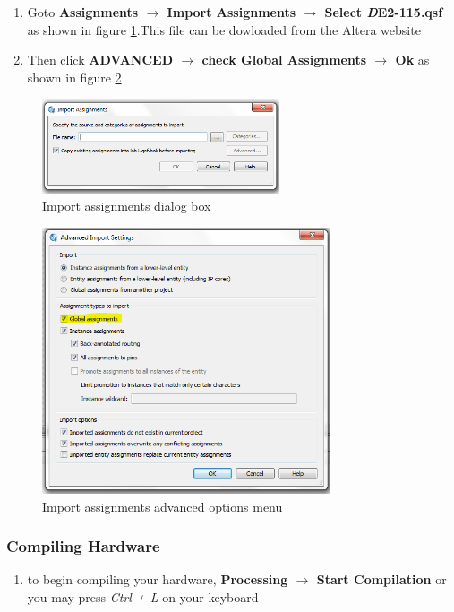  \begin{enumerate}  
 
	\item Goto {\bf Assignments $\rightarrow$  Import Assignments $\rightarrow$  Select \emph DE2-115.qsf} as shown in figure \ref{fig:importassign}.This file can be dowloaded from the Altera website
	
	\item Then click {\bf ADVANCED $\rightarrow$ check Global Assignments $\rightarrow$ Ok} as shown in figure \ref{fig:advancedimport}

\end{enumerate}

\begin{figure}[H]
	\centering
	\includegraphics[width=70mm]{Lab1/figures/importassign.png}
	\caption{Import assignments dialog box}
	\label{fig:importassign}
\end{figure}

\begin{figure}[H]
	\centering
	\includegraphics[width=85mm]{Lab1/figures/advancedimport.png}
	\caption{Import assignments advanced options menu}
	\label{fig:advancedimport}
\end{figure}

\subsubsection{Compiling Hardware}

\begin{enumerate}

	\item to begin compiling your hardware, {\bf Processing $\rightarrow$ Start Compilation} or you may press \emph{Ctrl + L} on your keyboard

\end{enumerate}

